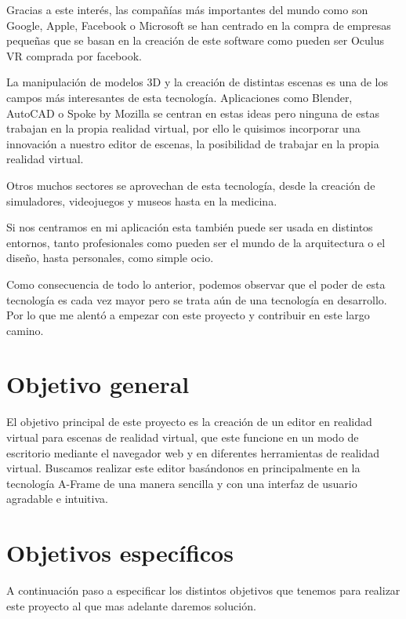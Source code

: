 \documentclass[a4paper, 12pt]{book}
\begin{document}
Gracias a este interés, las compañías más importantes del mundo como son Google, Apple, Facebook o Microsoft se han centrado en la compra de empresas pequeñas que se basan en la creación de este software como pueden ser Oculus VR comprada por facebook. 

La manipulación de modelos 3D y la creación de distintas escenas es una de los campos más interesantes de esta tecnología. Aplicaciones como Blender, AutoCAD o Spoke by Mozilla se centran en estas ideas pero ninguna de estas trabajan en la propia realidad virtual, por ello le quisimos incorporar una innovación a nuestro editor de escenas, la posibilidad de trabajar en la propia realidad virtual.

Otros muchos sectores se aprovechan de esta tecnología, desde la creación de  simuladores, videojuegos y museos hasta en la medicina.

Si nos centramos en mi aplicación esta también puede ser usada en distintos entornos, tanto profesionales como pueden ser el mundo de la arquitectura o el diseño, hasta personales, como simple ocio.

Como consecuencia de todo lo anterior, podemos observar que el poder de esta tecnología es cada vez mayor pero se trata aún de una tecnología en desarrollo. Por lo que me alentó a empezar con este proyecto y contribuir en este largo camino.

\section{Objetivo general}
\label{sec:objetivo general}

El objetivo principal de este proyecto es la creación de un editor en realidad virtual para escenas de realidad virtual, que este funcione en un modo de escritorio mediante el navegador web y en diferentes herramientas de realidad virtual. Buscamos realizar este editor basándonos en principalmente en la tecnología A-Frame de una manera sencilla y con una interfaz de usuario agradable e intuitiva.

\section{Objetivos específicos}
\label{sec:Objetivos específicos}

A continuación paso a especificar los distintos objetivos que tenemos para realizar este proyecto al que mas adelante daremos solución. 
\end{document}
